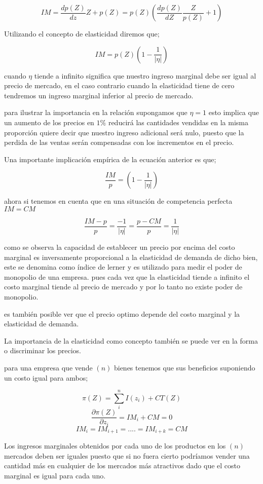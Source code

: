 \documentclass[12pt]{article}
\providecommand{\abs}[1]{\lvert#1\rvert}
\begin{document}
$$IM= \dfrac{dp(Z)}{dz}Z+p(Z)= p(Z)\left(\dfrac{dp(Z)}{dZ}\dfrac{Z}{p(Z)}+1\right)$$


Utilizando el concepto de elasticidad diremos que;

$$IM=p(Z)\left(1-\dfrac{1}{\abs{\eta}}\right)$$

cuando $\eta$ tiende a infinito significa que nuestro ingreso marginal debe ser igual al precio de mercado, en el caso contrario cuando la elasticidad tiene de cero tendremos un ingreso marginal inferior al precio de mercado.

para ilustrar la importancia en la relación supongamos que $\eta=1$ esto implica que un aumento de los precios en $ 1 \% $ reducirá las cantidades vendidas en la misma proporción quiere decir que nuestro ingreso adicional será nulo, puesto que la perdida de las ventas serán compensadas con los incrementos en el precio.

Una importante implicación empírica de la ecuación anterior es que;

$$ \dfrac{IM}{p}=\left(1-\dfrac{1}{\abs{\eta}}\right)$$

ahora si tenemos en cuenta que en una situación de competencia perfecta $IM=CM$


$$\dfrac{IM-p}{p}=\dfrac{-1}{\abs{\eta}} = \dfrac{p-CM}{p}=\dfrac{1}{\abs{\eta}}$$

como se observa la capacidad de establecer un precio por encima del costo marginal es inversamente proporcional a la elasticidad de demanda de dicho bien, este se denomina como índice de lerner y es utilizado para medir el poder de monopolio de una empresa. pues cada vez que la elasticidad tiende a infinito el costo marginal tiende al precio de mercado y por lo tanto no existe poder de monopolio.

es también posible ver que el precio optimo depende del costo marginal y la elasticidad de demanda.




La importancia de la elasticidad como concepto también se puede ver en la forma o discriminar los precios.

para una empresa que vende $(n)$ bienes tenemos que sus beneficios suponiendo un costo igual para ambos;

$$\pi(Z)=\sum_{i}^{n}I(z_{i}) + CT(Z)$$
$$\dfrac{\partial \pi(Z)}{\partial z_{i}}=IM_{i}+CM=0$$
$$IM_{i}=IM_{i+1}=....=IM_{i+k}=CM$$

Los ingresos marginales obtenidos por cada uno de los productos en los $(n)$ mercados deben ser iguales puesto que si no fuera cierto podríamos vender una cantidad más en cualquier de los mercados más atractivos dado que el costo marginal es igual para cada uno.
\end{document}
